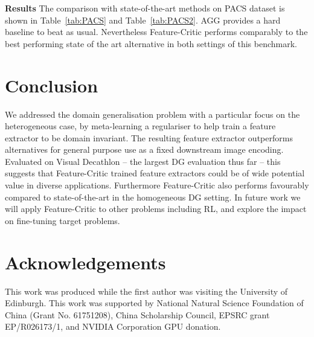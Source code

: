 \documentclass{article}
\newcommand{\modelname}{Feature-Critic}
\newcommand{\keypoint}[1]{\vspace{0.0cm}\noindent\textbf{#1}\quad}
\begin{document}
\keypoint{Results} The comparison with state-of-the-art methods on PACS dataset is shown in Table~\ref{tab:PACS} and Table~\ref{tab:PACS2}. AGG provides a hard baseline to beat as usual. Nevertheless \modelname{} performs comparably to the best performing state of the art alternative in both settings of this benchmark.

\section{Conclusion}
We addressed the domain generalisation problem with a particular focus on the heterogeneous case,  by meta-learning a regulariser to help train a feature extractor to be domain invariant. The resulting feature extractor outperforms alternatives for general purpose use as a fixed downstream image encoding. Evaluated on Visual Decathlon -- the largest DG evaluation thus far -- this suggests that \modelname{} trained feature extractors could be of wide potential value in diverse applications. Furthermore \modelname{} also performs favourably compared to state-of-the-art in the homogeneous DG setting. In future work we will apply \modelname{} to other problems including RL, and explore the impact on fine-tuning target problems.

\section*{Acknowledgements}
This work was produced while the first author was
visiting the University of Edinburgh. This work was supported by National Natural Science Foundation of China (Grant No. 61751208),
 China Scholarship Council, EPSRC grant EP/R026173/1, and NVIDIA Corporation GPU donation.





\end{document}

